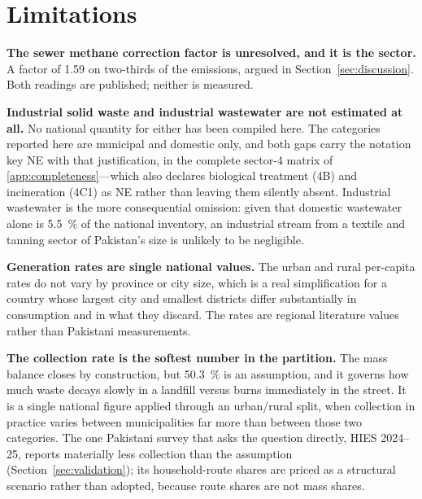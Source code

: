 \section{Limitations}
\label{sec:limitations}

\textbf{The sewer methane correction factor is unresolved, and it is the sector.} A factor of
\num{1.59} on two-thirds of the emissions, argued in Section~\ref{sec:discussion}. Both
readings are published; neither is measured.

\textbf{Industrial solid waste and industrial wastewater are not estimated at all.} No national
quantity for either has been compiled here. The categories reported here are municipal and
domestic only, and both gaps carry the notation key NE with that justification, in the
complete sector-4 matrix of \ref{app:completeness}---which also declares biological
treatment (4B) and incineration (4C1) as NE rather than leaving them silently absent.
Industrial wastewater is the more consequential omission: given that domestic wastewater
alone is \SI{5.5}{\percent} of the national inventory, an industrial stream from a textile
and tanning sector of Pakistan's size is unlikely to be negligible.

\textbf{Generation rates are single national values.} The urban and rural per-capita rates do
not vary by province or city size, which is a real simplification for a country whose largest
city and smallest districts differ substantially in consumption and in what they discard. The
rates are regional literature values rather than Pakistani measurements.

\textbf{The collection rate is the softest number in the partition.} The mass balance
closes by construction, but \SI{50.3}{\percent} is an assumption, and it governs how much
waste decays slowly in a landfill versus burns immediately in the street. It is a single
national figure applied through an urban/rural split, when collection in practice varies
between municipalities far more than between those two categories. The one Pakistani survey
that asks the question directly, HIES 2024--25, reports materially less collection than the
assumption (Section~\ref{sec:validation}); its household-route shares are priced as a
structural scenario rather than adopted, because route shares are not mass shares.

